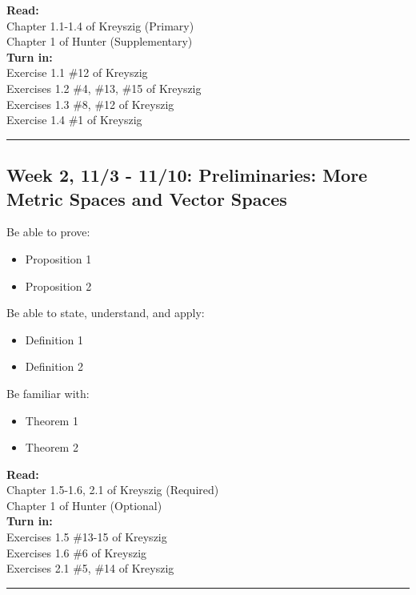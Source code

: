 \documentclass[course=Introduction\ to\ Functional\ Analysis, semester=Fall\ 2021]{syllabustemplate}
\begin{document}
{\textbf{Read:}\\
Chapter 1.1-1.4 of Kreyszig (Primary)\\
Chapter 1 of Hunter (Supplementary)\\

\textbf{Turn in:}\\
Exercise 1.1 \#12 of Kreyszig\\
Exercises 1.2 \#4, \#13, \#15 of Kreyszig\\
Exercises 1.3 \#8, \#12 of Kreyszig\\
Exercise 1.4 \#1 of Kreyszig
\hrule
\subsection{Week 2, 11/3 - 11/10: Preliminaries: More Metric Spaces and Vector Spaces}
\label{sub:week_2_11_3_11_10_preliminaries_more_metric_spaces_and_vector_spaces}


Be able to prove:
\begin{itemize}
	\item Proposition 1
	\item Proposition 2
\end{itemize}

Be able to state, understand, and apply:
\begin{itemize}
	\item Definition 1
	\item Definition 2
\end{itemize}

Be familiar with:
\begin{itemize}
	\item Theorem 1
	\item Theorem 2
\end{itemize}
\vspace{1em}

\textbf{Read:}\\
Chapter 1.5-1.6, 2.1 of Kreyszig (Required)\\
Chapter 1 of Hunter (Optional)\\

\textbf{Turn in:}\\
Exercises 1.5 \#13-15 of Kreyszig\\
Exercises 1.6 \#6 of Kreyszig\\
Exercises 2.1 \#5, \#14 of Kreyszig\\
\hrule
}


\end{document}
